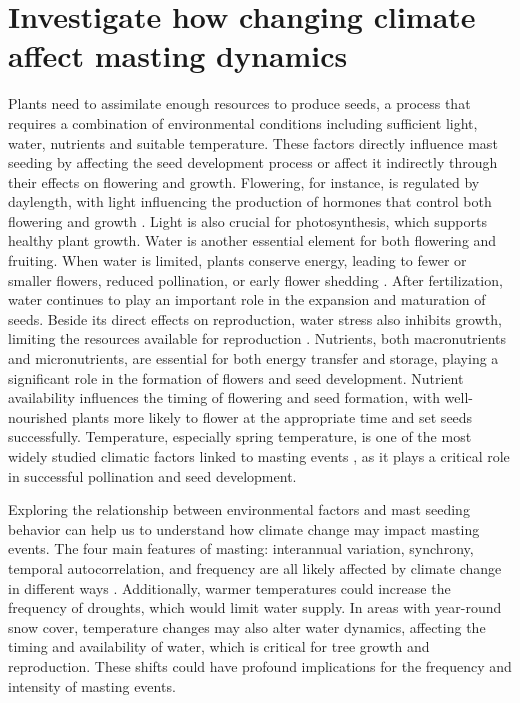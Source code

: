 \documentclass[11pt,letter]{article}
\begin{document}
\section{Investigate how changing climate affect masting dynamics}
Plants need to assimilate enough resources to produce seeds, a process that requires a combination of environmental conditions including sufficient light, water, nutrients and suitable temperature. These factors directly influence mast seeding by affecting the seed development process or affect it indirectly through their effects on flowering and growth. Flowering, for instance, is regulated by daylength, with light influencing the production of hormones that control both flowering and growth \citep{lau2010plant}. Light is also crucial for photosynthesis, which supports healthy plant growth. Water is another essential element for both flowering and fruiting. When water is limited, plants conserve energy, leading to fewer or smaller flowers, reduced pollination, or early flower shedding \citep{gallagher2017shifts}. After fertilization, water continues to play an important role in the expansion and maturation of seeds. Beside its direct effects on reproduction, water stress also inhibits growth, limiting the resources available for reproduction \citep{hsiao1973plant, anjum2011morphological}. Nutrients, both macronutrients and micronutrients, are essential for both energy transfer and storage, playing a significant role in the formation of flowers and seed development. Nutrient availability influences the timing of flowering and seed formation, with well-nourished plants more likely to flower at the appropriate time and set seeds successfully. Temperature, especially spring temperature, is one of the most widely studied climatic factors linked to masting events \citep{bajocco2021characterizing, moreira2015effects, schauber2002masting, bogdziewicz2024evolutionary}, as it plays a critical role in successful pollination and seed development.\par

Exploring the relationship between environmental factors and mast seeding behavior can help us to understand how climate change may impact masting events. The four main features of masting: interannual variation, synchrony, temporal autocorrelation, and frequency are all likely affected by climate change in different ways \citep{hacket2021climate}. Additionally, warmer temperatures could increase the frequency of droughts, which would limit water supply. In areas with year-round snow cover, temperature changes may also alter water dynamics, affecting the timing and availability of water, which is critical for tree growth and reproduction. These shifts could have profound implications for the frequency and intensity of masting events.\par
\end{document}
